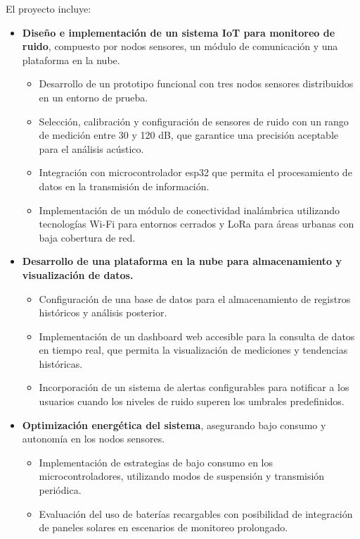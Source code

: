 \documentclass[
11pt, %
]{charter}
\begin{document}
\clearpage
El proyecto incluye:
\begin{itemize}
    \item \textbf{Diseño e implementación de un sistema IoT para monitoreo de ruido}, compuesto por nodos sensores, un módulo de comunicación y una plataforma en la nube.
    \begin{itemize}
        \item Desarrollo de un prototipo funcional con tres nodos sensores distribuidos en un entorno de prueba.
        \item Selección, calibración y configuración de sensores de ruido con un rango de medición entre 30 y 120 dB, 
        que garantice una precisión aceptable para el análisis acústico.
        \item Integración con microcontrolador esp32 que permita el procesamiento de datos en la transmisión de información.
        \item Implementación de un módulo de conectividad inalámbrica utilizando tecnologías Wi-Fi para entornos cerrados y LoRa para áreas urbanas con baja cobertura de red.
    \end{itemize}
    
    \item \textbf{Desarrollo de una plataforma en la nube para almacenamiento y visualización de datos.}
    \begin{itemize}
        \item Configuración de una base de datos para el almacenamiento de registros históricos y análisis posterior.
        \item Implementación de un dashboard web accesible para la consulta de datos en tiempo real, que permita la visualización de mediciones y tendencias históricas.
        \item Incorporación de un sistema de alertas configurables para notificar a los usuarios cuando los niveles de ruido superen los umbrales predefinidos.
    \end{itemize}
    
    \item \textbf{Optimización energética del sistema}, asegurando bajo consumo y autonomía en los nodos sensores.
    \begin{itemize}
        \item Implementación de estrategias de bajo consumo en los microcontroladores, utilizando modos de suspensión y transmisión periódica.
        \item Evaluación del uso de baterías recargables con posibilidad de integración de paneles solares en escenarios de monitoreo prolongado.
    \end{itemize}
    
\end{itemize}
\end{document}
